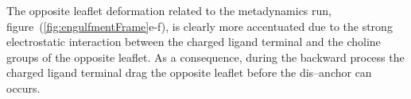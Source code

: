 The opposite leaflet deformation related to the metadynamics run, figure~(\ref{fig:engulfmentFrame}e-f), is clearly more accentuated due to the strong electrostatic interaction between the charged ligand terminal and the choline groups of the opposite leaflet. As a consequence, during the backward process the charged ligand terminal drag the opposite leaflet before the dis--anchor can occurs.
\begin{figure}[ht!]
	\center
		\ %
		\\\bigskip%
		\ %
		\\\bigskip%
\end{figure}
